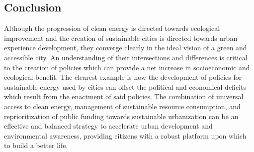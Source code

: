 \documentclass[10pt, oneside, letterpaper]{article}
\begin{document}
\begin{multicols}{2}
	\section{Conclusion}
	
	Although the progression of clean energy is directed towards ecological improvement and the creation of sustainable cities is directed towards urban experience development, they converge clearly in the ideal vision of a green and accessible city. An understanding of their intersections and differences is critical to the creation of policies which can provide a net increase in socioeconomic and ecological benefit. The clearest example is how the development of policies for sustainable energy used by cities can offset the political and economical deficits which result from the enactment of said policies. The combination of universal access to clean energy, management of sustainable resource consumption, and reprioritization of public funding towards sustainable urbanization can be an effective and balanced strategy to accelerate urban development and environmental awareness, providing citizens with a robust platform upon which to build a better life.

	\end{multicols}

	\nocite{*}  %
	
	{\RaggedRight
		
	}
\end{document}
